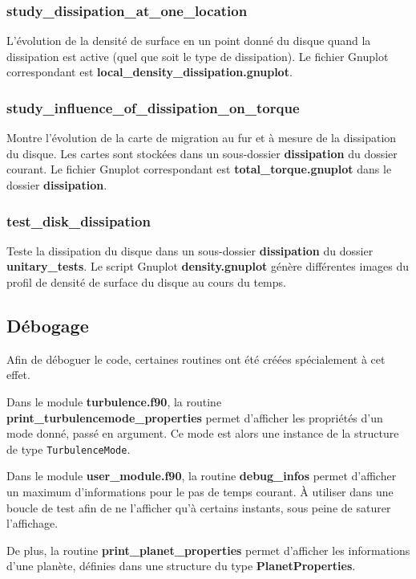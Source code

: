 \subsubsection{study\_dissipation\_at\_one\_location}
L'évolution de la densité de surface en un point donné du disque quand la dissipation est active (quel que soit le type de dissipation). Le fichier Gnuplot correspondant est \textbf{local\_density\_dissipation.gnuplot}. 

\subsubsection{study\_influence\_of\_dissipation\_on\_torque}
Montre l'évolution de la carte de migration au fur et à mesure de la dissipation du disque. Les cartes sont stockées dans un sous-dossier \textbf{dissipation} du dossier courant. Le fichier Gnuplot correspondant est \textbf{total\_torque.gnuplot} dans le dossier \textbf{dissipation}. 


\subsubsection{test\_disk\_dissipation}
Teste la dissipation du disque dans un sous-dossier \textbf{dissipation} du dossier \textbf{unitary\_tests}. Le script Gnuplot \textbf{density.gnuplot} génère différentes images du profil de densité de surface du disque au cours du temps.


\subsection{Débogage}
Afin de déboguer le code, certaines routines ont été créées spécialement à cet effet. 

Dans le module \textbf{turbulence.f90}, la routine \textbf{print\_turbulencemode\_properties} permet d'afficher les propriétés d'un mode donné, passé en argument. Ce mode est alors une instance de la structure de type \texttt{TurbulenceMode}. 

Dans le module \textbf{user\_module.f90}, la routine \textbf{debug\_infos} permet d'afficher un maximum d'informations pour le
pas de temps courant. À utiliser dans une boucle de test afin de ne l'afficher qu'à certains instants, sous peine de saturer
l'affichage. 

De plus, la routine \textbf{print\_planet\_properties} permet d'afficher les informations d'une planète, définies dans une structure du type \textbf{PlanetProperties}.


